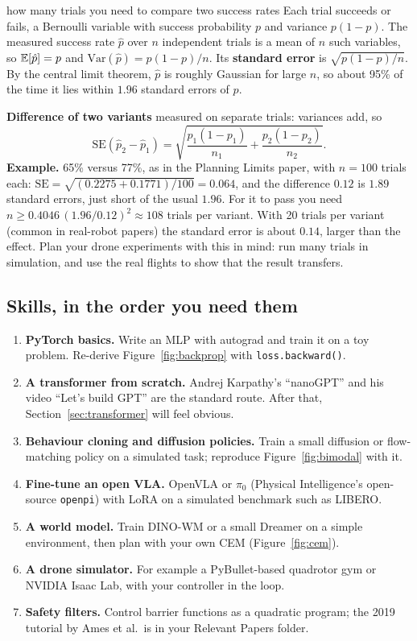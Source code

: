 \begin{probbox}{how many trials you need to compare two success rates}
Each trial succeeds or fails, a Bernoulli variable with success probability $p$ and variance $p(1-p)$. The measured success rate $\hat p$ over $n$ independent trials is a mean of $n$ such variables, so $\mathbb{E}[\hat p]=p$ and $\mathrm{Var}(\hat p)=p(1-p)/n$. Its \textbf{standard error} is $\sqrt{p(1-p)/n}$. By the central limit theorem, $\hat p$ is roughly Gaussian for large $n$, so about 95\% of the time it lies within $1.96$ standard errors of $p$.

\textbf{Difference of two variants} measured on separate trials: variances add, so
\[
\mathrm{SE}(\hat p_2-\hat p_1)=\sqrt{\frac{p_1(1-p_1)}{n_1}+\frac{p_2(1-p_2)}{n_2}} .
\]
\textbf{Example.} 65\% versus 77\%, as in the Planning Limits paper, with $n=100$ trials each: $\mathrm{SE}=\sqrt{(0.2275+0.1771)/100}=0.064$, and the difference $0.12$ is $1.89$ standard errors, just short of the usual $1.96$. For it to pass you need $n\ge0.4046\,(1.96/0.12)^2\approx108$ trials per variant. With 20 trials per variant (common in real-robot papers) the standard error is about $0.14$, larger than the effect. Plan your drone experiments with this in mind: run many trials in simulation, and use the real flights to show that the result transfers.
\end{probbox}

\subsection{Skills, in the order you need them}
\begin{enumerate}
\item \textbf{PyTorch basics.} Write an MLP with autograd and train it on a toy problem. Re-derive Figure~\ref{fig:backprop} with \texttt{loss.backward()}.
\item \textbf{A transformer from scratch.} Andrej Karpathy's ``nanoGPT'' and his video ``Let's build GPT'' are the standard route. After that, Section~\ref{sec:transformer} will feel obvious.
\item \textbf{Behaviour cloning and diffusion policies.} Train a small diffusion or flow-matching policy on a simulated task; reproduce Figure~\ref{fig:bimodal} with it.
\item \textbf{Fine-tune an open VLA.} OpenVLA or $\pi_0$ (Physical Intelligence's open-source \texttt{openpi}) with LoRA on a simulated benchmark such as LIBERO.
\item \textbf{A world model.} Train DINO-WM or a small Dreamer on a simple environment, then plan with your own CEM (Figure~\ref{fig:cem}).
\item \textbf{A drone simulator.} For example a PyBullet-based quadrotor gym or NVIDIA Isaac Lab, with your controller in the loop.
\item \textbf{Safety filters.} Control barrier functions as a quadratic program; the 2019 tutorial by Ames et al.\ is in your Relevant Papers folder.
\end{enumerate}


